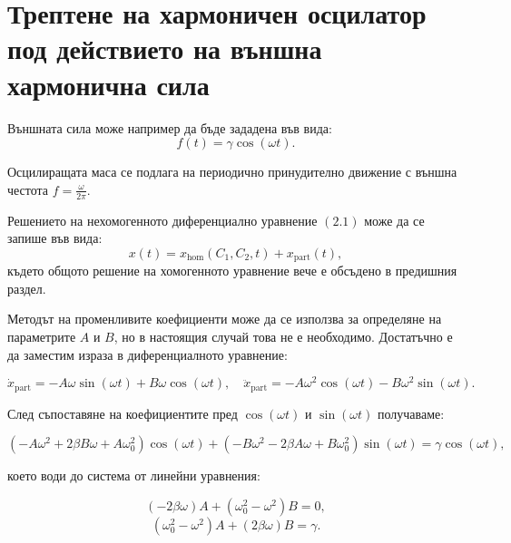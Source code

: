 \documentclass{report}
\begin{document}
\section{Трептене на хармоничен осцилатор под действието на външна хармонична сила}
Външната сила може например да бъде зададена във вида:
\[
f(t) = \gamma \cos(\omega t).
\]

Осцилиращата маса се подлага на периодично принудително движение с външна честота \( f = \frac{\omega}{2\pi} \).

Решението на нехомогенното диференциално уравнение $(2.1)$ може да се запише във вида:
\[
x(t) = x_{\text{hom}}(C_1, C_2, t) + x_{\text{part}}(t),
\]
където общото решение на хомогенното уравнение вече е обсъдено в предишния раздел. 

Методът на променливите коефициенти може да се използва за определяне на параметрите \(A\) и \(B\), но в настоящия случай това не е необходимо. Достатъчно е да заместим израза в диференциалното уравнение:

\[
\dot{x}_{\text{part}} = -A \omega \sin(\omega t) + B \omega \cos(\omega t), \quad
\ddot{x}_{\text{part}} = -A \omega^2 \cos(\omega t) - B \omega^2 \sin(\omega t).
\]

След съпоставяне на коефициентите пред \(\cos(\omega t)\) и \(\sin(\omega t)\) получаваме:

\[
(-A\omega^2 + 2\beta B\omega + A\omega_0^2) \cos(\omega t) + 
(-B\omega^2 - 2\beta A\omega + B\omega_0^2) \sin(\omega t) = \gamma \cos(\omega t),
\]

което води до система от линейни уравнения:

\[
(-2\beta \omega)A + (\omega_0^2 - \omega^2)B = 0,
\]
\[
(\omega_0^2 - \omega^2)A + (2\beta \omega)B = \gamma.
\]
\end{document}
